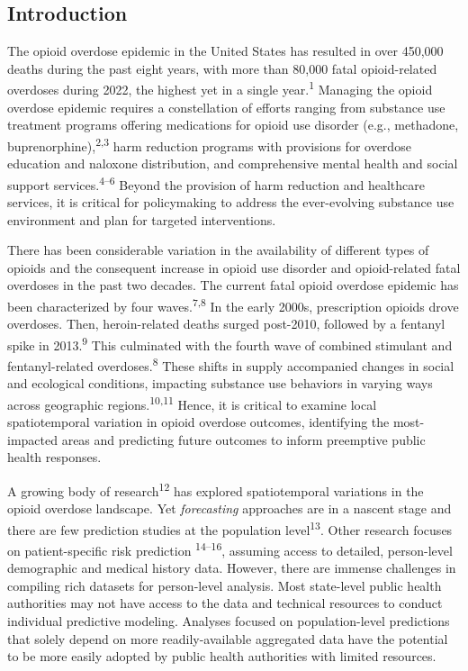 \subsection{Introduction}\label{introduction}

The opioid overdose epidemic in the United States has resulted in over 450,000 deaths during the past eight years, with more than 80,000 fatal opioid-related overdoses during 2022, the highest yet in a single year.\textsuperscript{1} Managing the opioid overdose epidemic requires a constellation of efforts ranging from substance use treatment programs offering medications for opioid use disorder (e.g., methadone, buprenorphine),\textsuperscript{2,3} harm reduction programs with provisions for overdose education and naloxone distribution, and comprehensive mental health and social support services.\textsuperscript{4--6} Beyond the provision of harm reduction and healthcare services, it is critical for policymaking to address the ever-evolving substance use environment and plan for targeted interventions.

There has been considerable variation in the availability of different types of opioids and the consequent increase in opioid use disorder and opioid-related fatal overdoses in the past two decades. The current fatal opioid overdose epidemic has been characterized by four waves.\textsuperscript{7,8} In the early 2000s, prescription opioids drove overdoses. Then, heroin-related deaths surged post-2010, followed by a fentanyl spike in 2013.\textsuperscript{9} This culminated with the fourth wave of combined stimulant and fentanyl-related overdoses.\textsuperscript{8} These shifts in supply accompanied changes in social and ecological conditions, impacting substance use behaviors in varying ways across geographic regions.\textsuperscript{10,11} Hence, it is critical to examine local spatiotemporal variation in opioid overdose outcomes, identifying the most-impacted areas and predicting future outcomes to inform preemptive public health responses.

A growing body of research\textsuperscript{12} has explored spatiotemporal variations in the opioid overdose landscape. Yet \emph{forecasting} approaches are in a nascent stage and there are few prediction studies at the population level\textsuperscript{13}. Other research focuses on patient-specific risk prediction \textsuperscript{14--16}, assuming access to detailed, person-level demographic and medical history data. However, there are immense challenges in compiling rich datasets for person-level analysis. Most state-level public health authorities may not have access to the data and technical resources to conduct individual predictive modeling. Analyses focused on population-level predictions that solely depend on more readily-available aggregated data have the potential to be more easily adopted by public health authorities with limited resources.

